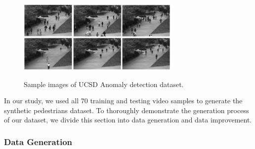 \begin{figure}[H]
	\centering
	{\includegraphics[width=0.7\textwidth]{images/anomaly}}
	\caption{Sample images of UCSD Anomaly detection dataset.}
	\label{fig:anomaly}
\end{figure}


\indent In our study, we used all 70 training and testing video samples to generate the synthetic pedestrians dataset. To thoroughly demonstrate the generation process of our dataset, we divide this section into data generation and data improvement.

  
\subsubsection{Data Generation}


